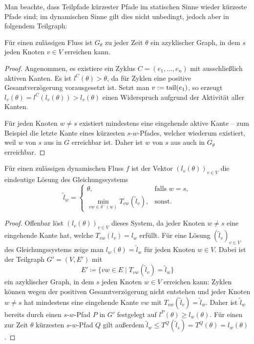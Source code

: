 Man beachte, dass Teilpfade kürzester Pfade im statischen Sinne wieder kürzeste Pfade sind; im dynamischen Sinne gilt dies nicht unbedingt, jedoch aber in folgendem Teilgraph:

\begin{lemma}\label{lemma-shortest-path-using-active-edges}
	Für einen zulässigen Fluss ist $G_\theta$ zu jeder Zeit $\theta$ ein azyklischer Graph, in dem $s$ jeden Knoten $v\in V$ erreichen kann.
\end{lemma}
\begin{proof}
	Angenommen, es existiere ein Zyklus $C=(e_1, \dots, e_n)$ mit ausschließlich aktiven Kanten.
	Es ist $l^C(\theta) > \theta$, da für Zyklen eine positive Gesamtverzögerung vorausgesetzt ist.
	Setzt man $v:= \operatorname{tail}(e_1)$, so erzeugt $l_{v}(\theta) = l^C(l_{v}(\theta)) > l_{v}(\theta)$ einen Widerspruch aufgrund der Aktivität aller Kanten.
	
	Für jeden Knoten $w\neq s$ existiert mindestens eine eingehende aktive Kante -- zum Beispiel die letzte Kante eines kürzesten $s$-$w$-Pfades, welcher wiederum existiert, weil $w$ von $s$ aus in $G$ erreichbar ist.
	Daher ist $w$ von $s$ aus auch in $G_\theta$ erreichbar.
\end{proof}

\begin{proposition}\label{prop-arrival-times-vector}
	Für einen zulässigen dynamischen Fluss $f$ ist der Vektor $(l_v(\theta))_{v\in V}$ die eindeutige Lösung des Gleichungssystems
	\[ \tilde{l}_w = \begin{cases}
	\theta, & \text{falls } w=s, \\
	\min\limits_{vw\in \delta^-(w)} T_{vw}(\tilde{l}_v), & \text{sonst}.
	\end{cases} \]
\end{proposition}
\begin{proof}
	Offenbar löst $(l_v(\theta))_{v\in V}$ dieses System, da jeder Knoten $w\neq s$ eine eingehende Kante hat, welche $T_{vw}(l_v) = l_w$ erfüllt.
	Für eine Lösung $(\tilde{l}_v)_{v\in V}$ des Gleichungssystems zeige man $l_w(\theta) = \tilde{l}_w$ für jeden Knoten $w\in V$.
	Dabei ist der Teilgraph $G'=(V, E')$ mit
	\[ E' \coloneq  \{ vw \in E \mid T_{vw}(\tilde{l}_v ) = \tilde{l}_w \} \]
	ein azyklischer Graph, in dem $s$ jeden Knoten $w\in V$ erreichen kann:
	Zyklen können wegen der positiven Gesamtverzögerung nicht entstehen und jeder Knoten $w\neq s$ hat mindestens eine eingehende Kante $vw$ mit $T_{vw}(\tilde{l}_v) = \tilde{l}_w$.
	Daher ist $\tilde{l}_w$ bereits durch einen $s$-$w$-Pfad $P$ in $G'$ festgelegt auf $l^P(\theta)\geq l_w(\theta)$.
	Für einen zur Zeit $\theta$ kürzesten $s$-$w$-Pfad $Q$ gilt außerdem $\tilde{l}_w \leq T^Q(\tilde{l}_s) = T^Q(\theta) = l_w(\theta)$.
\end{proof}


